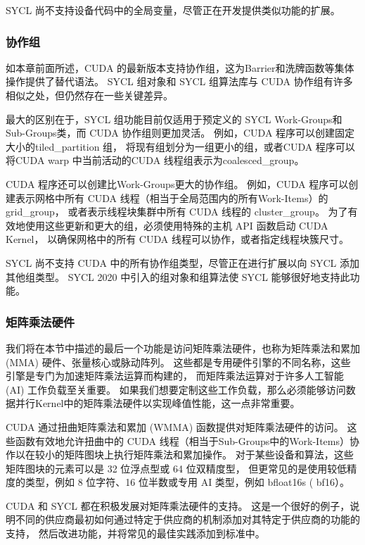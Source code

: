 SYCL 尚不支持设备代码中的全局变量，尽管正在开发提供类似功能的扩展。

\subsubsection{协作组}
如本章前面所述，CUDA 的最新版本支持协作组，这为Barrier和洗牌函数等集体操作提供了替代语法。 
SYCL 组对象和 SYCL 组算法库与 CUDA 协作组有许多相似之处，但仍然存在一些关键差异。

最大的区别在于，SYCL 组功能目前仅适用于预定义的 SYCL Work-Groups和Sub-Groups类，而 CUDA 协作组则更加灵活。 
例如，CUDA 程序可以创建固定大小的tiled\_partition 组，
将现有组划分为一组更小的组，或者CUDA 程序可以将CUDA warp 中当前活动的CUDA 线程组表示为coalesced\_group。

CUDA 程序还可以创建比Work-Groups更大的协作组。 
例如，CUDA 程序可以创建表示网格中所有 CUDA 线程（相当于全局范围内的所有Work-Items）的 grid\_group，
或者表示线程块集群中所有 CUDA 线程的 cluster\_group。 
为了有效地使用这些更新和更大的组，必须使用特殊的主机 API 函数启动 CUDA Kernel，
以确保网格中的所有 CUDA 线程可以协作，或者指定线程块簇尺寸。

SYCL 尚不支持 CUDA 中的所有协作组类型，尽管正在进行扩展以向 SYCL 添加其他组类型。 
SYCL 2020 中引入的组对象和组算法使 SYCL 能够很好地支持此功能。

\subsubsection{矩阵乘法硬件}
我们将在本节中描述的最后一个功能是访问矩阵乘法硬件，也称为矩阵乘法和累加 (MMA) 硬件、张量核心或脉动阵列。 
这些都是专用硬件引擎的不同名称，这些引擎是专门为加速矩阵乘法运算而构建的，
而矩阵乘法运算对于许多人工智能 (AI) 工作负载至关重要。 
如果我们想要定制这些工作负载，那么必须能够访问数据并行Kernel中的矩阵乘法硬件以实现峰值性能，这一点非常重要。

CUDA 通过扭曲矩阵乘法和累加 (WMMA) 函数提供对矩阵乘法硬件的访问。 
这些函数有效地允许扭曲中的 CUDA 线程（相当于Sub-Groups中的Work-Items）协作以在较小的矩阵图块上执行矩阵乘法和累加操作。 
对于某些设备和算法，这些矩阵图块的元素可以是 32 位浮点型或 64 位双精度型，
但更常见的是使用较低精度的类型，例如 8 位字符、16 位半数或专用 AI 类型，例如 bfloat16s ( bf16）。

CUDA 和 SYCL 都在积极发展对矩阵乘法硬件的支持。 
这是一个很好的例子，说明不同的供应商最初如何通过特定于供应商的机制添加对其特定于供应商的功能的支持，
然后改进功能，并将常见的最佳实践添加到标准中。

